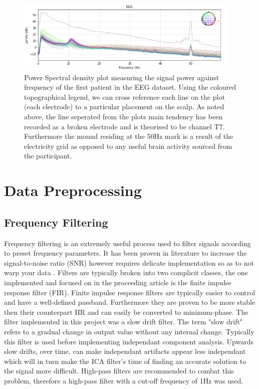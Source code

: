 \documentclass[11pt]{article}
\begin{document}
\begin{figure}[tb]
\centering
\includegraphics[width=0.95\textwidth]{PSDPlot.png}
\caption{\label{fig:PSDPlot}
Power Spectral density plot measuring the signal power against frequency of the first patient in the EEG dataset. Using the coloured topographical legend, we can cross reference each line on the plot (each electrode) to a particular placement on the scalp. As noted above, the line seperated from the plots main tendency has been recorded as a broken electrode and is theorised to be channel T7. Furthermore the mound residing at the 50Hz mark is a result of the electricity grid as opposed to any useful brain activity sourced from the participant.}
\end{figure} 

\section{Data Preprocessing}

\subsection{Frequency Filtering}

Frequency filtering is an extremely useful process used to filter signals according to preset frequency parameters. It has been proven in literature to increase the signal-to-noise ratio (SNR) however requires delicate implementation so as to not warp your data \cite{Filtering}. Filters are typically broken into two complicit classes, the one implemented and focused on in the proceeding article is the finite impulse response filter (FIR). Finite impulse response filters are typically easier to control and have a well-defined passband. Furthermore they are proven to be more stable then their counterpart IIR and can easily be converted to minimum-phase. The filter implemented in this project was a slow drift filter. The term "slow drift" refers to a gradual change in output value without any internal change. Typically this filter is used before implementing independant component analysis. Upwards slow drifts, over time, can make independant artifacts appear less independant which will in turn make the ICA filter's time of finding an accurate solution to the signal more difficult. High-pass filters are recommended to combat this problem, therefore a high-pass filter with a cut-off frequency of 1Hz was used. 
\end{document}
